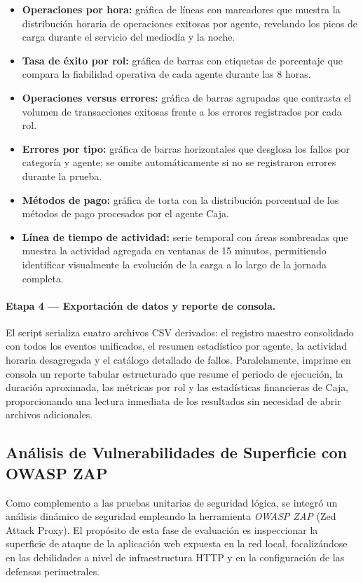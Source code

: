 \begin{itemize}
	\item \textbf{Operaciones por hora:} gráfica de líneas con marcadores que muestra la distribución horaria de operaciones exitosas por agente, revelando los picos de carga durante el servicio del mediodía y la noche.
	\item \textbf{Tasa de éxito por rol:} gráfica de barras con etiquetas de porcentaje que compara la fiabilidad operativa de cada agente durante las 8 horas.
	\item \textbf{Operaciones versus errores:} gráfica de barras agrupadas que contrasta el volumen de transacciones exitosas frente a los errores registrados por cada rol.
	\item \textbf{Errores por tipo:} gráfica de barras horizontales que desglosa los fallos por categoría y agente; se omite automáticamente si no se registraron errores durante la prueba.
	\item \textbf{Métodos de pago:} gráfica de torta con la distribución porcentual de los métodos de pago procesados por el agente Caja.
	\item \textbf{Línea de tiempo de actividad:} serie temporal con áreas sombreadas que muestra la actividad agregada en ventanas de 15 minutos, permitiendo identificar visualmente la evolución de la carga a lo largo de la jornada completa.
\end{itemize}

\paragraph{Etapa 4 — Exportación de datos y reporte de consola.} El script serializa cuatro archivos CSV derivados: el registro maestro consolidado con todos los eventos unificados, el resumen estadístico por agente, la actividad horaria desagregada y el catálogo detallado de fallos. Paralelamente, imprime en consola un reporte tabular estructurado que resume el periodo de ejecución, la duración aproximada, las métricas por rol y las estadísticas financieras de Caja, proporcionando una lectura inmediata de los resultados sin necesidad de abrir archivos adicionales.

\subsection{Análisis de Vulnerabilidades de Superficie con OWASP ZAP}

Como complemento a las pruebas unitarias de seguridad lógica, se integró un análisis dinámico de seguridad empleando la herramienta \textit{OWASP ZAP} (Zed Attack Proxy). El propósito de esta fase de evaluación es inspeccionar la superficie de ataque de la aplicación web expuesta en la red local, focalizándose en las debilidades a nivel de infraestructura HTTP y en la configuración de las defensas perimetrales.

